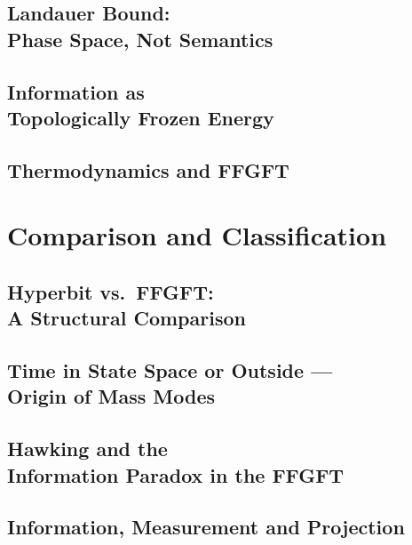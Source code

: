 \documentclass[11pt,twoside,openright]{book}
\theoremstyle{plain}
\theoremstyle{definition}
\begin{document}
\chapter[Landauer Bound: Phase Space, Not Semantics]{Landauer Bound:\\
Phase Space, Not Semantics}


\chapter[Information as Topologically Frozen Energy]{Information as\\
Topologically Frozen Energy}


\chapter{Thermodynamics and FFGFT}


\part{Comparison and Classification}

\chapter[Hyperbit vs.\ FFGFT]{Hyperbit vs.\ FFGFT:\\
A Structural Comparison}


\chapter[Time in State Space or Outside]{Time in State Space or Outside ---\\
Origin of Mass Modes}


\chapter[Hawking and the Information Paradox]{Hawking and the\\
Information Paradox in the FFGFT}


\chapter{Information, Measurement and Projection}

\end{document}
